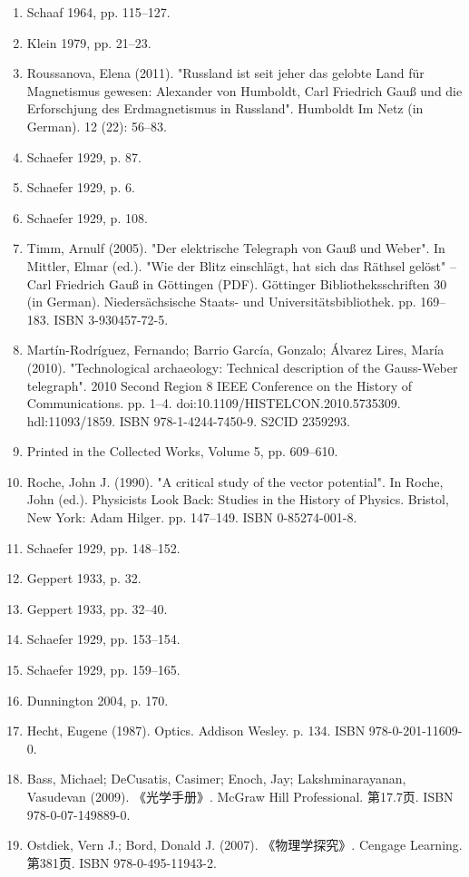 \begin{enumerate}
\item Schaaf 1964, pp. 115–127.
\item Klein 1979, pp. 21–23.
\item Roussanova, Elena (2011). "Russland ist seit jeher das gelobte Land für Magnetismus gewesen: Alexander von Humboldt, Carl Friedrich Gauß und die Erforschjung des Erdmagnetismus in Russland". Humboldt Im Netz (in German). 12 (22): 56–83.
\item Schaefer 1929, p. 87.
\item Schaefer 1929, p. 6.
\item Schaefer 1929, p. 108.
\item Timm, Arnulf (2005). "Der elektrische Telegraph von Gauß und Weber". In Mittler, Elmar (ed.). "Wie der Blitz einschlägt, hat sich das Räthsel gelöst" – Carl Friedrich Gauß in Göttingen (PDF). Göttinger Bibliotheksschriften 30 (in German). Niedersächsische Staats- und Universitätsbibliothek. pp. 169–183. ISBN 3-930457-72-5.
\item Martín-Rodríguez, Fernando; Barrio García, Gonzalo; Álvarez Lires, María (2010). "Technological archaeology: Technical description of the Gauss-Weber telegraph". 2010 Second Region 8 IEEE Conference on the History of Communications. pp. 1–4. doi:10.1109/HISTELCON.2010.5735309. hdl:11093/1859. ISBN 978-1-4244-7450-9. S2CID 2359293.
\item Printed in the Collected Works, Volume 5, pp. 609–610.
\item Roche, John J. (1990). "A critical study of the vector potential". In Roche, John (ed.). Physicists Look Back: Studies in the History of Physics. Bristol, New York: Adam Hilger. pp. 147–149. ISBN 0-85274-001-8.
\item Schaefer 1929, pp. 148–152.
\item Geppert 1933, p. 32.
\item Geppert 1933, pp. 32–40.
\item Schaefer 1929, pp. 153–154.
\item Schaefer 1929, pp. 159–165.
\item Dunnington 2004, p. 170.
\item Hecht, Eugene (1987). Optics. Addison Wesley. p. 134. ISBN 978-0-201-11609-0.
\item Bass, Michael; DeCusatis, Casimer; Enoch, Jay; Lakshminarayanan, Vasudevan (2009). 《光学手册》. McGraw Hill Professional. 第17.7页. ISBN 978-0-07-149889-0.  
\item Ostdiek, Vern J.; Bord, Donald J. (2007). 《物理学探究》. Cengage Learning. 第381页. ISBN 978-0-495-11943-2.  

\end{enumerate}

